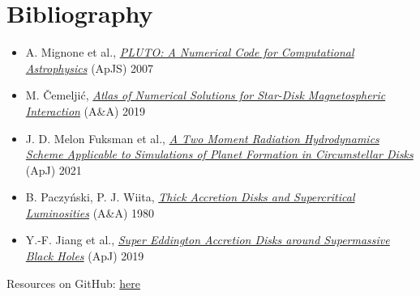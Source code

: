 	\section{Bibliography}

	\begin{frame}
		\begin{center}\textcolor{MASS}{}\end{center}\vspace{2ex}
		\begin{itemize}
			\item A. Mignone et al., {\itshape{\href{https://ui.adsabs.harvard.edu/abs/2007ApJS..170..228M}
													{PLUTO: A Numerical Code for Computational Astrophysics}}} (ApJS) 2007
			\item M. Čemeljić, {\itshape{\href{https://ui.adsabs.harvard.edu/abs/2019A\%26A...624A..31C}
											  {Atlas of Numerical Solutions for Star-Disk Magnetospheric Interaction}}} (A\&A) 2019
			\item J. D. Melon Fuksman et al., {\itshape{\href{https://ui.adsabs.harvard.edu/abs/2021ApJ...906...78M}
											  {A Two Moment Radiation Hydrodynamics Scheme Applicable to\break
											   Simulations of Planet Formation in Circumstellar Disks}}} (ApJ) 2021
			\item B. Paczyński, P. J. Wiita, {\itshape{\href{https://ui.adsabs.harvard.edu/abs/1980A\%26A....88...23P}
											  {Thick Accretion Disks and Supercritical Luminosities}}} (A\&A) 1980
			\item Y.-F. Jiang et al., {\itshape{\href{https://ui.adsabs.harvard.edu/abs/2019ApJ...880...67J}
											  {Super Eddington Accretion Disks around Supermassive Black Holes}}} (ApJ) 2019
		\end{itemize}
		\vspace{2ex}
		Resources on GitHub: \href{https://github.com/fritzali/notes/tree/main/CAMK}{here}
	\end{frame}

	\appendix


